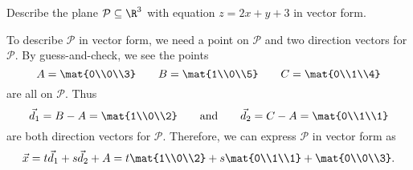 \begin{example}
	Describe the plane $\mathcal P\subseteq \R^3$ with equation $z=2x+y+3$ in vector form.

	To describe $\mathcal P$ in vector form, we need a point on $\mathcal P$ and two direction
	vectors for $\mathcal P$. By guess-and-check, we see the points
	\[
		A=\mat{0\\0\\3}\qquad B=\mat{1\\0\\5}\qquad C=\mat{0\\1\\4}
	\]
	are all on $\mathcal P$. Thus
	\[
		\vec d_1=B-A=\mat{1\\0\\2}\qquad \text{and}\qquad
		\vec d_2=C-A=\mat{0\\1\\1}
	\]
	are both direction vectors for $\mathcal P$.  Therefore, we can express $\mathcal P$ in vector
	form as
	\[
		\vec x=t\vec d_1+s\vec d_2+A=t\mat{1\\0\\2}+s\mat{0\\1\\1}+\mat{0\\0\\3}.
	\]
\end{example}




